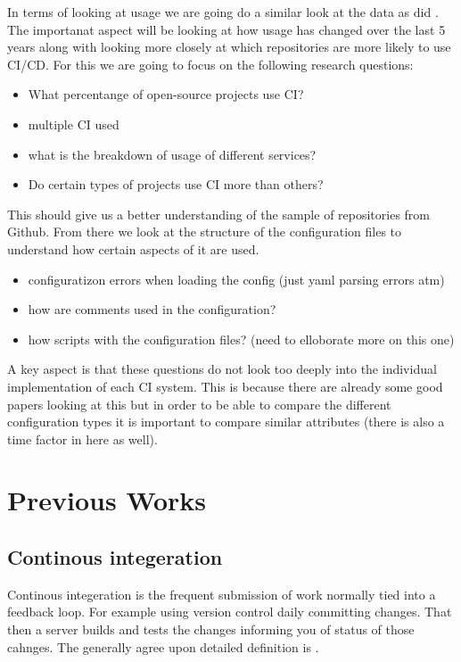 \documentclass[twoside,12pt,titlepage,a4paper]{article}
\begin{document}
In terms of looking at usage we are going do a similar look at the data as did \cite{Hilton2016}. The importanat aspect will be looking at how usage has changed over the last 5 years along with looking more closely at which repositories are more likely to use CI/CD. For this we are going to focus on the following research questions:
\begin{itemize}
  \item What percentange of open-source projects use CI?
  \item multiple CI used
  \item what is the breakdown of usage of different services?
  \item Do certain types of projects use CI more than others?
\end{itemize}

This should give us a better understanding of the sample of repositories from Github. From there we look at the structure of the configuration files to understand how certain aspects of it are used.
\begin{itemize}
  \item configuratizon errors when loading the config (just yaml parsing errors atm)
  \item how are comments used in the configuration?
  \item how scripts with the configuration files? (need to elloborate more on this one)
\end{itemize}

A key aspect is that these questions do not look too deeply into the individual implementation of each CI system. This is because there are already some good papers looking \cite{Gallaba2018} at this but in order to be able to compare the different configuration types it is important to compare similar attributes (there is also a time factor in here as well). 

\section{Previous Works}
\vspace*{-0.05in}
\subsection{Continous integeration}
\vspace*{-0.05in}

Continous integeration is the frequent submission of work normally tied into a feedback loop. For example using version control daily committing changes. That then a server builds and tests the changes informing you of status of those cahnges. The generally agree upon detailed definition is \cite{CI2010_MartinFowler}.
\end{document}
